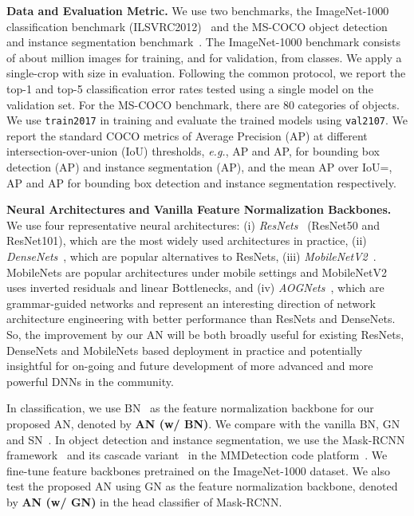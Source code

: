 \documentclass[runningheads]{llncs}
\newcommand{\eg}{\emph{e.g.}}
\begin{document}
\textbf{Data and Evaluation Metric.} We use two benchmarks, the ImageNet-1000 classification benchmark (ILSVRC2012)~\cite{ImageNet} and the MS-COCO object detection and instance segmentation benchmark~\cite{COCO}. The ImageNet-1000 benchmark consists of about  million images for training, and  for validation, from  classes. We apply a single-crop with size  in evaluation. Following the common protocol, we report  the top-1 and top-5 classification error rates tested using a single model on the validation set. For the MS-COCO benchmark, there are 80 categories of objects. We use {\tt train2017} in training and evaluate the trained models using {\tt val2107}. We report the standard COCO metrics of Average Precision (AP) at different intersection-over-union (IoU) thresholds, \eg, AP and AP, for bounding box detection (AP) and instance segmentation (AP), and the mean AP over IoU=, AP and AP for bounding box detection and instance segmentation respectively.



\textbf{Neural Architectures and Vanilla Feature Normalization Backbones.} We use four representative neural architectures: (i) \textit{ResNets}~\cite{ResidualNet} (ResNet50 and ResNet101), which are the most widely used architectures in practice, (ii) \textit{DenseNets}~\cite{DenseNet}, which are popular alternatives to ResNets, (iii) \textit{MobileNetV2}~\cite{sandler2018mobilenetv2}. MobileNets are popular architectures under mobile settings and MobileNetV2 uses inverted residuals and linear Bottlenecks, and (iv) \textit{AOGNets}~\cite{AOGNets}, which are grammar-guided networks and represent an interesting direction of network architecture engineering with better performance than ResNets and DenseNets. So, the improvement by our AN will be both broadly useful for existing ResNets, DenseNets and MobileNets based deployment in practice and potentially insightful for on-going and future development of more advanced and more powerful DNNs in the community. 

In classification, we use BN~\cite{BatchNorm} as the feature normalization backbone for our proposed AN, denoted by \textbf{AN (w/ BN)}. We compare with the vanilla BN, GN~\cite{GroupNorm} and SN~\cite{SwitchNorm}. In object detection and instance segmentation, we use the Mask-RCNN framework~\cite{maskrcnn} and its cascade variant~\cite{cascadercnn} in the MMDetection code platform~\cite{mmdetection}. We fine-tune feature backbones pretrained on the ImageNet-1000 dataset. We also test the proposed AN using GN as the feature normalization backbone, denoted by \textbf{AN (w/ GN)} in the head classifier of Mask-RCNN.
\end{document}
